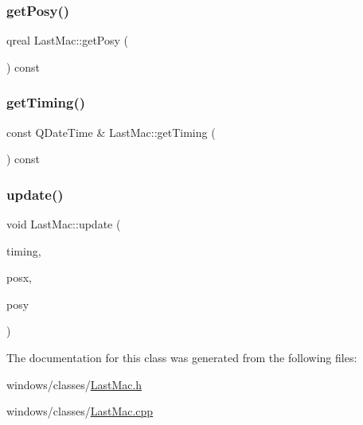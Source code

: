 \mbox{\label{class_last_mac_a86a580b8a3a7463b739f63d5df5d8b99}} 
\subsubsection{\texorpdfstring{get\+Posy()}{getPosy()}}
{\footnotesize\ttfamily qreal Last\+Mac\+::get\+Posy (\begin{DoxyParamCaption}{ }\end{DoxyParamCaption}) const}

\mbox{\label{class_last_mac_aad658ad67a78c517d59627d41685137e}} 
\subsubsection{\texorpdfstring{get\+Timing()}{getTiming()}}
{\footnotesize\ttfamily const Q\+Date\+Time \& Last\+Mac\+::get\+Timing (\begin{DoxyParamCaption}{ }\end{DoxyParamCaption}) const}

\mbox{\label{class_last_mac_a65b9f0ab0708f58e914edebaf0b24232}} 
\subsubsection{\texorpdfstring{update()}{update()}}
{\footnotesize\ttfamily void Last\+Mac\+::update (\begin{DoxyParamCaption}\item[{const Q\+Date\+Time \&}]{timing,  }\item[{qreal}]{posx,  }\item[{qreal}]{posy }\end{DoxyParamCaption})}



The documentation for this class was generated from the following files\+:\begin{DoxyCompactItemize}
\item 
windows/classes/\hyperlink{_last_mac_8h}{Last\+Mac.\+h}\item 
windows/classes/\hyperlink{_last_mac_8cpp}{Last\+Mac.\+cpp}\end{DoxyCompactItemize}
